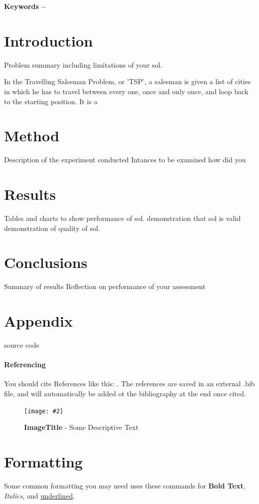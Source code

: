 \documentclass[10pt, a4paper]{article}
\title{\mytitle}
\author{\myauthor\hspace{1em}\\\contact\\Edinburgh Napier University\hspace{0.5em}-\hspace{0.5em}\mymodule}
\date{}
\newcommand{\figuremacro}[5]{
    \begin{figure}[#1]
        \centering
        \texttt{[image: \#2]}
        \caption[#3]{\textbf{#3}#4}
        \label{fig:#2}
    \end{figure}
}
\begin{document}
	\maketitle
	\begin{abstract}
		\lipsum[2]
	\end{abstract}
    
	\textbf{Keywords -- }{\mykeywords}
    
	\section{Introduction}
	Problem summary including limitations of your sol.
	
	In the Travelling Salesman Problem, or 'TSP', a salesman is given a list of cities in which he has to travel between every one, once and only once, and loop back to the starting position. It is a 
	\section{Method}
	Description of the experiment conducted
	Intances to be examined how did you 
	
	\section{Results}
	Tables and charts to show performance of sol.
	demonstration that sol is valid
	demonstration of quality of sol.
	\section{Conclusions}
	Summary of results
	Reflection on performance of your assessment
	\section{Appendix}
	source code
    \paragraph{Referencing}
    You should cite References like this: \cite{Keshav}. The references are saved in an external .bib file, and will automatically be added ot the bibliography at the end once cited.
    
    \figuremacro{h}{placeholder}{ImageTitle}{ - Some Descriptive Text}{1.0}
	
	\section{Formatting}
	Some common formatting you may need uses these commands for \textbf{Bold Text}, \textit{Italics}, and \underline{underlined}.
\end{document}
